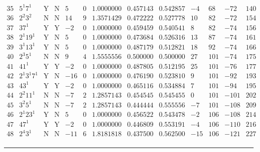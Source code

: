 \documentclass[11pt,reqno,a4letter]{article}
\numberwithin{equation}{section}
\numberwithin{figure}{section}
\numberwithin{table}{section}
\theoremstyle{plain}
\numberwithin{theorem}{section}
\theoremstyle{definition}
\begin{document}
\begin{table}[ht!]
\begin{equation*}
{\begin{array}{cc|cc|ccc|cc|cccc}
 35 & 5^1 7^1 & \text{Y} & \text{N} & 5 & 0 & 1.0000000 & 0.457143 & 0.542857 & -4 & 68 & -72 & 140 \\
 36 & 2^2 3^2 & \text{N} & \text{N} & 14 & 9 & 1.3571429 & 0.472222 & 0.527778 & 10 & 82 & -72 & 154 \\
 37 & 37^1 & \text{Y} & \text{Y} & -2 & 0 & 1.0000000 & 0.459459 & 0.540541 & 8 & 82 & -74 & 156 \\
 38 & 2^1 19^1 & \text{Y} & \text{N} & 5 & 0 & 1.0000000 & 0.473684 & 0.526316 & 13 & 87 & -74 & 161 \\
 39 & 3^1 13^1 & \text{Y} & \text{N} & 5 & 0 & 1.0000000 & 0.487179 & 0.512821 & 18 & 92 & -74 & 166 \\
 40 & 2^3 5^1 & \text{N} & \text{N} & 9 & 4 & 1.5555556 & 0.500000 & 0.500000 & 27 & 101 & -74 & 175 \\
 41 & 41^1 & \text{Y} & \text{Y} & -2 & 0 & 1.0000000 & 0.487805 & 0.512195 & 25 & 101 & -76 & 177 \\
 42 & 2^1 3^1 7^1 & \text{Y} & \text{N} & -16 & 0 & 1.0000000 & 0.476190 & 0.523810 & 9 & 101 & -92 & 193 \\
 43 & 43^1 & \text{Y} & \text{Y} & -2 & 0 & 1.0000000 & 0.465116 & 0.534884 & 7 & 101 & -94 & 195 \\
 44 & 2^2 11^1 & \text{N} & \text{N} & -7 & 2 & 1.2857143 & 0.454545 & 0.545455 & 0 & 101 & -101 & 202 \\
 45 & 3^2 5^1 & \text{N} & \text{N} & -7 & 2 & 1.2857143 & 0.444444 & 0.555556 & -7 & 101 & -108 & 209 \\
 46 & 2^1 23^1 & \text{Y} & \text{N} & 5 & 0 & 1.0000000 & 0.456522 & 0.543478 & -2 & 106 & -108 & 214 \\
 47 & 47^1 & \text{Y} & \text{Y} & -2 & 0 & 1.0000000 & 0.446809 & 0.553191 & -4 & 106 & -110 & 216 \\
 48 & 2^4 3^1 & \text{N} & \text{N} & -11 & 6 & 1.8181818 & 0.437500 & 0.562500 & -15 & 106 & -121 & 227 \\
\end{array}
}
\end{equation*}

\hrule\medskip 


\end{table}
\end{document}
